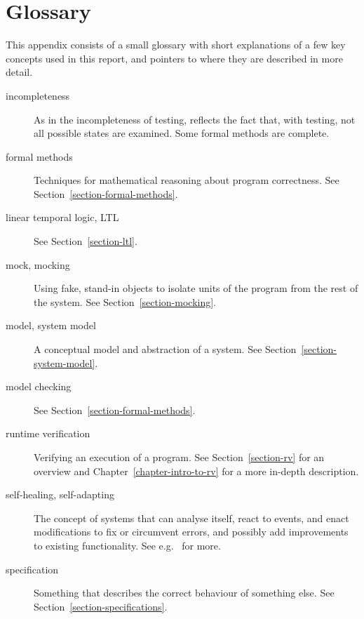 \documentclass[a4paper,11pt]{kth-mag}
\begin{document}

\appendix
\addappheadtotoc

\chapter{Glossary} \label{appendix-glossary}

This appendix consists of a small glossary with short explanations of a few
key concepts used in this report, and pointers to where they are described in
more detail.

\begin{description}
  \item[incompleteness] As in the incompleteness of testing, reflects the fact
    that, with testing, not all possible states are examined. Some formal
    methods are complete.

  \item[formal methods] Techniques for mathematical reasoning about program
    correctness. See Section~\ref{section-formal-methods}.

  \item[linear temporal logic, LTL] See Section~\ref{section-ltl}.

  \item[mock, mocking] Using fake, stand-in objects to isolate units of the
    program from the rest of the system. See Section~\ref{section-mocking}.

  \item[model, system model] A conceptual model and abstraction of a system.
    See Section~\ref{section-system-model}.

  \item[model checking] See Section~\ref{section-formal-methods}.

  \item[runtime verification] Verifying an execution of a program. See
    Section~\ref{section-rv} for an overview and
    Chapter~\ref{chapter-intro-to-rv} for a more in-depth description.

  \item[self-healing, self-adapting] The concept of systems that can analyse
    itself, react to events, and enact modifications to fix or circumvent
    errors, and possibly add improvements to existing functionality. See e.g.\
    \cite{huebscher08survey} for more.

  \item[specification] Something that describes the correct behaviour of
    something else. See Section~\ref{section-specifications}.


\end{description}
\end{document}
